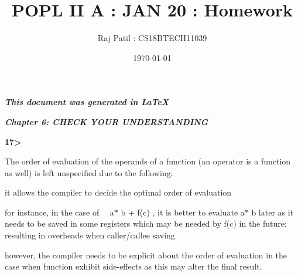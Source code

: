\documentclass[12pt]{article}
\title{POPL II A : JAN 20 : Homework}
\author{ Raj Patil : CS18BTECH11039 }
\date{\today}
\renewcommand{\_}{\kern-1.5pt\textunderscore\kern-1.5pt}
\begin{document}
\maketitle

\vspace{\baselineskip}

\vspace{\baselineskip}

\vspace{\baselineskip}

\vspace{\baselineskip}

\vspace{\baselineskip}

\vspace{\baselineskip}

\vspace{\baselineskip}
\par



\vspace{\baselineskip}



\newpage

\vspace{\baselineskip}
\vspace{\baselineskip}

\vspace{\baselineskip}
\textbf{\textit{This document was generated in \LaTeX}}\par
\textbf{\textit{Chapter 6: CHECK YOUR UNDERSTANDING }}\par


\vspace{\baselineskip}
\textbf{17>}\par

The order of evaluation of the operands of a function (an operator is a function as well) is left unspecified due to the following:\par

it allows the compiler to decide the optimal order of evaluation \par

for instance, in the case of \ \  a$\ast$ b + f(c)   , it is better to evaluate a$\ast$ b later as it needs to be saved in some registers which may be needed by f(c) in the future: resulting in overheads when caller/callee saving\par

however, the compiler needs to be explicit about the order of evaluation in the case when function exhibit side-effects as this may alter the final result.\par
\end{document}
